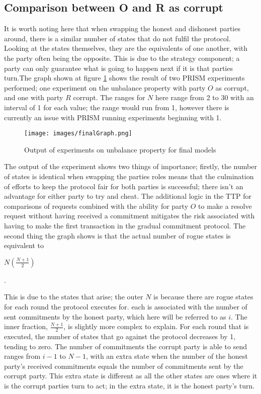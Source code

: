 \documentclass{l4proj}
\begin{document}
\subsection{Comparison between O and R as corrupt}
It is worth noting here that when swapping the honest and dishonest parties around, there is a similar number of states that do not fulfil the protocol. Looking at the states themselves, they are the equivalents of one another, with the party often being the opposite. This is due to the strategy component; a party can only guarantee what is going to happen next if it is that parties turn.The graph shown at figure \ref{finalGraph} shows the result of two PRISM experiments performed; one experiment on the unbalance property with party $O$ as corrupt, and one with party $R$ corrupt. The ranges for $N$ here range from 2 to 30 with an interval of 1 for each value; the range would run from 1, however there is currently an issue with PRISM running experiments beginning with 1.

\begin{figure}[ht!]
\centering
\texttt{[image: images/finalGraph.png]}
\caption{Output of experiments on unbalance property for final models}
\label{finalGraph}
\end{figure}

The output of the experiment shows two things of importance; firstly, the number of states is identical when swapping the parties roles means that the culmination of efforts to keep the protocol fair for both parties is successful; there isn't an advantage for either party to try and cheat. The additional logic in the TTP for comparisons of requests combined with the ability for party $O$ to make a resolve request without having received a commitment mitigates the risk associated with having to make the first transaction in the gradual commitment protocol. The second thing the graph shows is that the actual number of rogue states is equivalent to\\

\centerline{$N\left ( \frac{N + 1}{2} \right )$}.

This is due to the states that arise; the outer $N$ is because there are rogue states for each round the protocol executes for. each is associated with the number of sent commitments by the honest party, which here will be referred to as $i$. The inner fraction, $\frac{N + 1}{2}$, is slightly more complex to explain. For each round that is executed, the number of states that go against the protocol decreases by 1, tending to zero. The number of commitments the corrupt party is able to send ranges from $i-1$ to $N-1$, with an extra state when the number of the honest party's received commitments equals the number of commitments sent by the corrupt party. This extra state is different as all the other states are ones where it is the corrupt parties turn to act; in the extra state, it is the honest party's turn.
\end{document}
